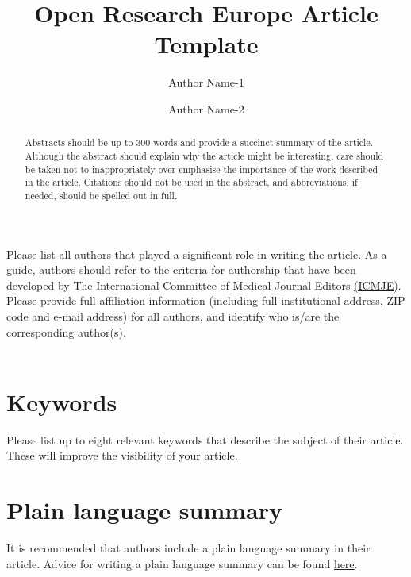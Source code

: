 \documentclass[10pt,a4paper]{article}
\begin{document}
\pagestyle{fancy}

\title{Open Research Europe Article Template}
\author[1]{Author Name-1}
\author[2]{Author Name-2}

\maketitle
\thispagestyle{fancy}

Please list all authors that played a significant role in writing the article. As a guide, authors should refer to the criteria for authorship that have been developed by The International Committee of Medical Journal Editors \href{http://www.icmje.org/recommendations/browse/roles-and-responsibilities/defining-the-role-of-authors-and-contributors.html}{(ICMJE)}. Please provide full affiliation information (including full institutional address, ZIP code and e-mail address) for all authors, and identify who is/are the corresponding author(s).
\\
\\
\begin{abstract}

Abstracts should be up to 300 words and provide a succinct summary of the article. Although the abstract should explain why the article might be interesting, care should be taken not to inappropriately over-emphasise the importance of the work described in the article. Citations should not be used in the abstract, and abbreviations, if needed, should be spelled out in full.

\end{abstract}

\section*{\color{OREblue}Keywords}

Please list up to eight relevant keywords that describe the subject of their article. These will improve the visibility of your article.


\clearpage
\pagestyle{fancy}

\section*{Plain language summary}

It is recommended that authors include a plain language summary in their article. Advice for writing a plain language summary can be found \href{https://www.dcc.ac.uk/guidance/how-guides/write-lay-summary}{here}.
\end{document}
